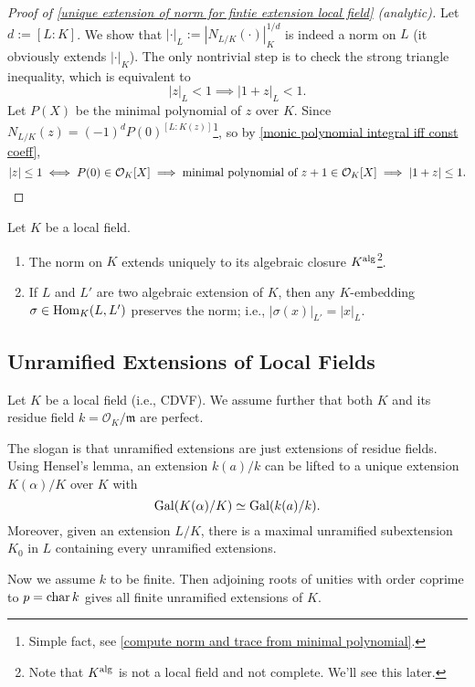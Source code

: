 \begin{proof}
    [Proof of \cref{unique extension of norm for fintie extension local field} (analytic)]
    Let $d := [L : K]$.
    We show that $|\cdot|_L := |N_{L/K}(\cdot)|_K^{1/d}$ is indeed a norm on $L$ (it obviously extends $|\cdot|_K$).
    The only nontrivial step is to check the strong triangle inequality, which is equivalent to \[|z|_L < 1\implies |1 + z|_L < 1.\]
    Let $P(X)$ be the minimal polynomial of $z$ over $K$.
    Since
    $N_{L/K}(z) = (-1)^{d} P(0)^{[L : K(z)]}$\footnote{Simple fact, see \cref{compute norm and trace from minimal polynomial}.},
    so by \cref{monic polynomial integral iff const coeff}, \[|z| \le 1\iff P(0)\in\mathcal{O}_K[X]\implies \text{minimal polynomial of }z+1\in \mathcal{O}_K[X]\implies |1 + z| \le 1.\qedhere\]
\end{proof}
\begin{corollary}
    Let $K$ be a local field.
    \begin{enumerate}
        \item [(1)]    The norm on $K$ extends uniquely to its algebraic closure $K^{\mathrm{alg}}$\footnote{Note that $K^{\mathrm{alg}}$ is not a local field and not complete. We'll see this later.}.
        \item [(2)] If $L$ and $L'$ are two algebraic extension of $K$,
        then any $K$-embedding $\sigma\in \operatorname{Hom}_K(L, L')$ preserves the norm; i.e., $|\sigma(x)|_{L'} = |x|_L$.
    \end{enumerate}
\end{corollary}

\subsection{Unramified Extensions of Local Fields}
Let $K$ be a local field (i.e., CDVF).
We assume further that both $K$ and its residue field $k = \mathcal{O}_K/\mathfrak{m}$ are perfect.

The slogan is that unramified extensions are just extensions of residue fields.
Using Hensel's lemma, an extension $k(a)/k$ can be lifted to a unique extension $K(\alpha)/K$ over $K$ with \[\operatorname{Gal}(K(\alpha)/K)\simeq \operatorname{Gal}(k(a)/k).\] Moreover, given an extension $L/K$, there is a maximal unramified subextension $K_0$ in $L$ containing every unramified extensions.

Now we assume $k$ to be finite. Then adjoining roots of unities with order coprime to $p = \operatorname{char} k$ gives all finite unramified extensions of $K$.

